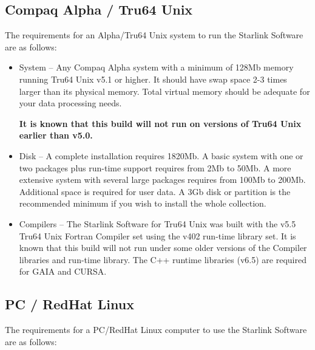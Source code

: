 \documentclass[twoside,11pt]{article}
\newcommand{\xlabel}[1]{}
\renewcommand{\_}{\texttt{\symbol{95}}}
\newcommand{\cdrom}{CD--ROM}
\newcommand{\cdrom}{CD-ROM}
\newcommand{\cdroms}{CD--ROMs}
\newcommand{\cdroms}{CD-ROMs}
\newcommand{\axpfull}{1820Mb}
\begin{document}

\subsection{\xlabel{dec_alpha_digital_unix}Compaq Alpha / Tru64 Unix}
\label{dec_alpha_digital_unix}

The requirements for an Alpha/Tru64 Unix system to run the Starlink Software
are as follows:

\begin{itemize}

\item System -- Any Compaq Alpha system with a minimum of 128Mb memory
running Tru64 Unix v5.1 or higher.  It should have swap space 2-3
times larger than its physical memory.  Total virtual memory should be
adequate for your data processing needs.

\textbf{It is known that this build will not run on versions of Tru64
Unix earlier than v5.0.}

\item Disk -- A complete installation requires \axpfull.
A basic system with one or two packages plus run-time support requires
from 2Mb to 50Mb.  A more extensive system with several large packages
requires from 100Mb to 200Mb.   Additional space is required for user
data.  A 3Gb disk or partition is the recommended minimum if you wish
to install the whole collection.

\item Compilers -- The Starlink Software for Tru64 Unix was built
with the v5.5 Tru64 Unix Fortran Compiler set using the v402 run-time
library set.  It is known that this build will not run under some older
versions of the Compiler libraries and run-time library.  The C++ runtime
libraries (v6.5) are required for GAIA and CURSA.

\end{itemize}

\subsection{\xlabel{intel_pc_linux}PC / RedHat Linux}
\label{intel_pc_linux}

The requirements for a PC/RedHat Linux computer to use the Starlink Software
are as follows:
\end{document}
